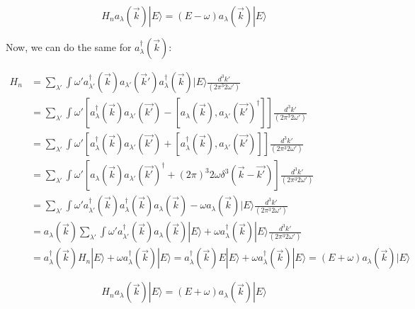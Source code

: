 \documentclass[a4]{article}
\begin{document}
    \begin{framed}
        \begin{equation}
            H_{n} a_{\lambda} (\vec{k}) | E \rangle = (E - \omega) a_{\lambda} (\vec{k}) | E \rangle
        \end{equation}
    \end{framed}

    Now, we can do the same for $a^{\dagger}_{\lambda} (\vec{k})$:

    \begin{equation}
        \begin{aligned}
            H_{n} & = \sum_{\lambda'} \int \omega' a_{\lambda'}^{\dagger} (\vec{k}) a_{\lambda'} (\vec{k}') a_{\lambda}^{\dagger} (\vec{k}) | E \rangle \frac{d^3 k'}{(2 \pi^{3} 2 \omega')} \\
            & = \sum_{\lambda'} \int \omega' [a_{\lambda}^{\dagger} (\vec{k}) a_{\lambda'} (\vec{k'}) - [a_{\lambda} (\vec{k}), a_{\lambda'} (\vec{k'})^{\dagger}]] \frac{d^3 k'}{(2 \pi^{3} 2 \omega')} \\
            & = \sum_{\lambda'} \int \omega' [a_{\lambda}^{\dagger} (\vec{k}) a_{\lambda'} (\vec{k'}) + [a_{\lambda}^{\dagger} (\vec{k}), a_{\lambda'} (\vec{k'})]] \frac{d^3 k'}{(2 \pi^{3} 2 \omega')} \\
            & = \sum_{\lambda'} \int \omega' [a_{\lambda} (\vec{k}) a_{\lambda'} (\vec{k'})^{\dagger} + (2 \pi)^{3} 2 \omega \delta^{3} (\vec{k} - \vec{k'})] \frac{d^3 k'}{(2 \pi^{3} 2 \omega')} \\
            & = \sum_{\lambda'} \int \omega' a_{\lambda'}^{\dagger} (\vec{k}) a_{\lambda}^{\dagger} (\vec{k}) a_{\lambda} (\vec{k}) - \omega a_{\lambda} (\vec{k}) | E \rangle \frac{d^3 k'}{(2 \pi^{3} 2 \omega')} \\
            & = a_{\lambda} (\vec{k}) \sum_{\lambda'} \int \omega' a_{\lambda'}^{\dagger} (\vec{k}) a_{\lambda} (\vec{k}) | E \rangle + \omega a_{\lambda}^{\dagger} (\vec{k}) | E \rangle \frac{d^3 k'}{(2 \pi^{3} 2 \omega')} \\
            & = a_{\lambda}^{\dagger} (\vec{k}) H_{n} | E \rangle + \omega a_{\lambda}^{\dagger} (\vec{k}) | E \rangle = a_{\lambda}^{\dagger} (\vec{k}) E | E \rangle + \omega a_{\lambda}^{\dagger} (\vec{k}) | E \rangle = (E + \omega) a_{\lambda} (\vec{k}) | E \rangle
        \end{aligned}
    \end{equation}

    \begin{framed}
        \begin{equation}
            H_{n} a_{\lambda} (\vec{k}) | E \rangle = (E + \omega) a_{\lambda} (\vec{k}) | E \rangle
        \end{equation}
    \end{framed}
\end{document}
